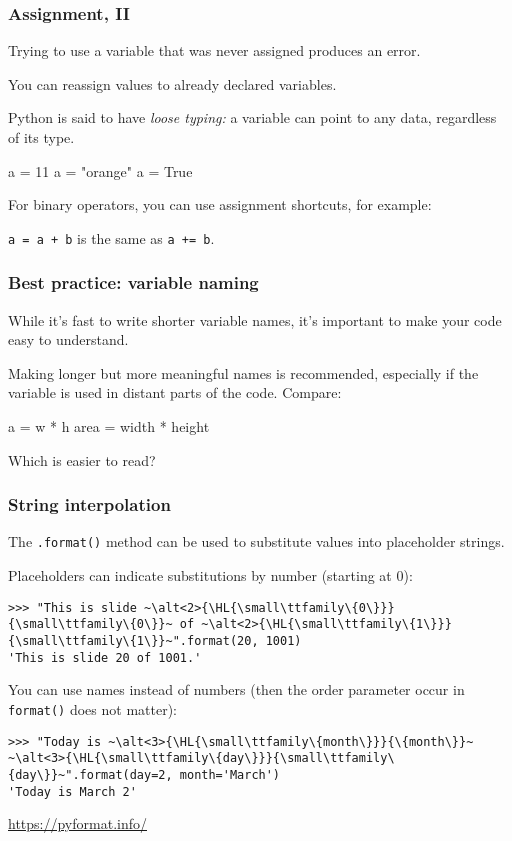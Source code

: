 \documentclass[english,serif,mathserif,xcolor=pdftex,dvipsnames,table]{beamer}
\begin{document}
\begin{frame}[fragile]
  \frametitle{Assignment, II}
  Trying to use a variable that was never assigned produces an error.
  
  \+
  You can reassign values to already declared variables.

  Python is said to have \emph{loose typing:} a variable
    can point to any data, regardless of its type.

\begin{semiverbatim}
\In a = 11
\In a = "orange"
\In a = True
\end{semiverbatim}

  For binary operators, you can use assignment shortcuts,
  for example:

  \+
  \texttt{a = a + b} is the same as \texttt{a += b}.

\end{frame}


\begin{frame}[fragile]
  \frametitle{Best practice: variable naming}
  
  While it's fast to write shorter variable names,
    it's important to make your code easy to understand.

  \+
  Making longer but more meaningful names is recommended,
    especially if the variable is used in distant parts
    of the code. Compare:

\begin{semiverbatim}
\In a = w * h
\In area = width * height
\end{semiverbatim}

Which is easier to read?
\end{frame}


\begin{frame}[fragile]
  \frametitle{String interpolation}
  The \lstinline|.format()| method can be used to substitute values into placeholder
  strings.

  \+ \pause
  Placeholders can indicate substitutions by number (starting at 0):
\begin{lstlisting}[basicstyle=\footnotesize\ttfamily]
>>> "This is slide ~\alt<2>{\HL{\small\ttfamily\{0\}}}{\small\ttfamily\{0\}}~ of ~\alt<2>{\HL{\small\ttfamily\{1\}}}{\small\ttfamily\{1\}}~".format(20, 1001)
'This is slide 20 of 1001.'
\end{lstlisting}

  \+ \pause
  You can use names instead of numbers (then the order parameter occur in
  \lstinline|format()| does not matter):
\begin{lstlisting}[basicstyle=\footnotesize\ttfamily]
>>> "Today is ~\alt<3>{\HL{\small\ttfamily\{month\}}}{\{month\}}~ ~\alt<3>{\HL{\small\ttfamily\{day\}}}{\small\ttfamily\{day\}}~".format(day=2, month='March')
'Today is March 2'
\end{lstlisting}

  \begin{references}
    \url{https://pyformat.info/}
  \end{references}
\end{frame}
\end{document}
